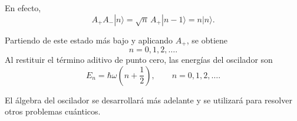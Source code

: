 En efecto,
\begin{equation}
A_+A_-|n\rangle
=\sqrt n\,A_+|n-1\rangle
=n|n\rangle.
\end{equation}

\begin{classroomqa}
\end{classroomqa}


Partiendo de este estado más bajo y aplicando \(A_+\), se obtiene
\begin{equation}
n=0,1,2,\ldots.
\end{equation}
Al restituir el término aditivo de punto cero, las energías del oscilador son
\begin{equation}
E_n=\hbar\omega\left(n+\frac{1}{2}\right),
\qquad n=0,1,2,\ldots.
\end{equation}

El álgebra del oscilador se desarrollará más adelante y se utilizará para resolver otros problemas cuánticos.